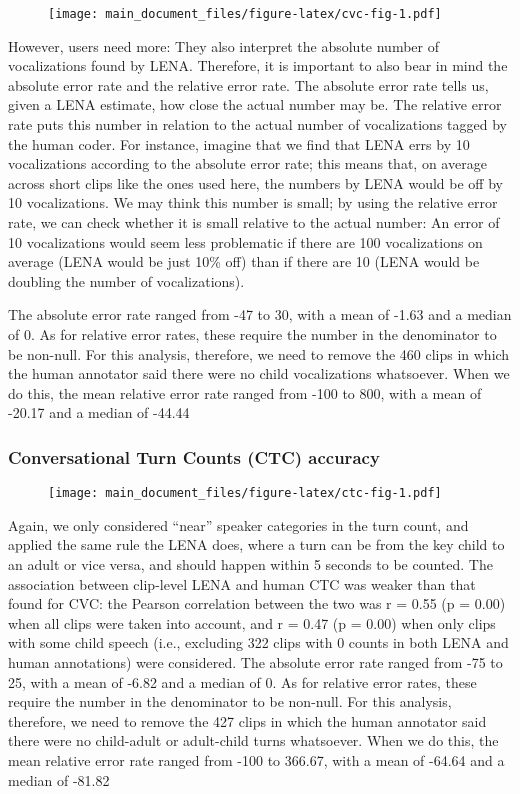\documentclass[english,floatsintext,man]{apa6}
\begin{document}
\begin{figure}
\centering
\texttt{[image: main\_document\_files/figure-latex/cvc-fig-1.pdf]}
\caption{}
\end{figure}

However, users need more: They also interpret the absolute number of
vocalizations found by LENA. Therefore, it is important to also bear in
mind the absolute error rate and the relative error rate. The absolute
error rate tells us, given a LENA estimate, how close the actual number
may be. The relative error rate puts this number in relation to the
actual number of vocalizations tagged by the human coder. For instance,
imagine that we find that LENA errs by 10 vocalizations according to the
absolute error rate; this means that, on average across short clips like
the ones used here, the numbers by LENA would be off by 10
vocalizations. We may think this number is small; by using the relative
error rate, we can check whether it is small relative to the actual
number: An error of 10 vocalizations would seem less problematic if
there are 100 vocalizations on average (LENA would be just 10\% off)
than if there are 10 (LENA would be doubling the number of
vocalizations).

The absolute error rate ranged from -47 to 30, with a mean of -1.63 and
a median of 0. As for relative error rates, these require the number in
the denominator to be non-null. For this analysis, therefore, we need to
remove the 460 clips in which the human annotator said there were no
child vocalizations whatsoever. When we do this, the mean relative error
rate ranged from -100 to 800, with a mean of -20.17 and a median of
-44.44

\subsubsection{Conversational Turn Counts (CTC)
accuracy}\label{conversational-turn-counts-ctc-accuracy}

\begin{figure}
\centering
\texttt{[image: main\_document\_files/figure-latex/ctc-fig-1.pdf]}
\caption{}
\end{figure}

Again, we only considered \enquote{near} speaker categories in the turn
count, and applied the same rule the LENA does, where a turn can be from
the key child to an adult or vice versa, and should happen within 5
seconds to be counted. The association between clip-level LENA and human
CTC was weaker than that found for CVC: the Pearson correlation between
the two was r = 0.55 (p = 0.00) when all clips were taken into account,
and r = 0.47 (p = 0.00) when only clips with some child speech (i.e.,
excluding 322 clips with 0 counts in both LENA and human annotations)
were considered. The absolute error rate ranged from -75 to 25, with a
mean of -6.82 and a median of 0. As for relative error rates, these
require the number in the denominator to be non-null. For this analysis,
therefore, we need to remove the 427 clips in which the human annotator
said there were no child-adult or adult-child turns whatsoever. When we
do this, the mean relative error rate ranged from -100 to 366.67, with a
mean of -64.64 and a median of -81.82
\end{document}
